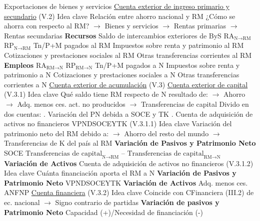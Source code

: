 \documentclass{nuevotema}
\begin{document}
\begin{esquemal}
				\4[] Exportaciones de bienes y servicios
				\4[] 
			\3 \underline{Cuenta exterior de ingreso primario y secundario} (V.2)
				\4 Idea clave
				\4[] Relación entre ahorro nacional y RM
				\4[] ¿Cómo se ahorra con respecto al RM?
				\4[] $\to$ Bienes y servicios
				\4[] $\to$ Rentas primarias
				\4[] $\to$ Rentas secundarias
				\4 \textbf{Recursos}
				\4[] Saldo de intercambios exteriores de ByS
				\4[] $\text{RA}_{\text{N} \to \text{RM}}$
				\4[] $\text{RP}_{\text{N} \to \text{RM}}$
				\4[] Tn/P+M pagados al RM
				\4[] Impuestos sobre renta y patrimonio al RM
				\4[] Cotizaciones y prestaciones sociales al RM
				\4[] Otras transferencias corrientes al RM
				\4 \textbf{Empleos}
				\4[] $\text{RA}_{\text{RM} \to \text{N}}$
				\4[] $\text{RP}_{\text{RM}\to \text{N}}$
				\4[] Tn/P+M pagados a N
				\4[] Impuestos sobre renta y patrimonio a N
				\4[] Cotizaciones y prestaciones sociales a N
				\4[] Otras transferencias corrientes a N
				\4[] 
			\3[] \underline{Cuenta exterior de acumulación} (V.3)
			\3 \underline{Cuenta exterior de capital} (V.3.1)
				\4 Idea clave
				\4[] Qué saldo tiene RM respecto de N resultado de:
				\4[] $\to$ Ahorro
				\4[] $\to$ Adq. menos ces. act. no producidos
				\4[] $\to$ Transferencias de capital
				\4 Divido en dos cuentas:
				. Variación del PN debida a SOCE y TK
				. Cuenta de adquisición de activos no financieros
			\3 VPNDSOCEYTK (V.3.1.1)
				\4 Idea clave
				\4[] Variación del patrimonio neto del RM debido a:
				\4[] $\to$ Ahorro del resto del mundo
				\4[] $\to$ Transferencias de K del país al RM
				\4 \textbf{Variación de Pasivos y Patrimonio Neto}
				\4[] SOCE
				\4[] $\text{Transferencias de capital}_{\text{N} \to \text{RM}}$
				\4[] -- $\text{Transferencias de capital}_{\text{RM}\to \text{N}}$
				\4 \textbf{Variación de Activos}
				\4[] 
			\3 Cuenta de adquisición de activos no financieros (V.3.1.2)
				\4 Idea clave
				\4[] Cuánta financiación aporta el RM a N
				\4 \textbf{Variación de Pasivos y Patrimonio Neto}
				\4[] VPNDSOCEYTK
				\4 \textbf{Variación de Activos}
				\4[] Adq. menos ces. ANFNP
				\4[] 
			\3 \underline{Cuenta financiera} (V.3.2)
				\4 Idea clave
				\4[] Coincide con CFinanciera (III.2) de ec. nacional
				\4[] $\to$ Signo contrario de partidas
				\4 \textbf{Variación de pasivos y Patrimonio Neto}
				\4[] Capacidad (+)/Necesidad de financiación (-)

\end{esquemal}
\end{document}
